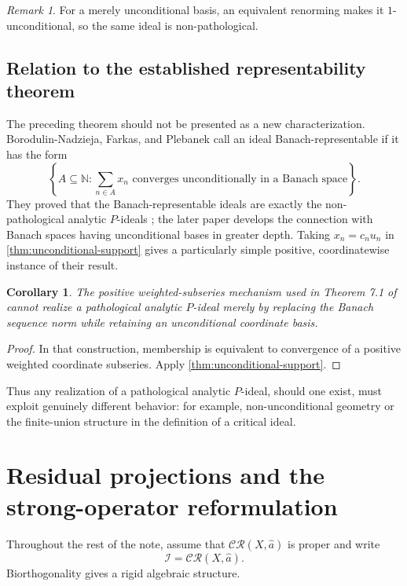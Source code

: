 \documentclass[11pt]{article}
\newtheorem{corollary}[theorem]{Corollary}
\theoremstyle{definition}
\theoremstyle{remark}
\newtheorem{remark}[theorem]{Remark}
\newcommand{\N}{\mathbb N}
\newcommand{\I}{\mathcal I}
\newcommand{\CR}{\mathcal{CR}}
\begin{document}
\begin{remark}
For a merely unconditional basis, an equivalent renorming makes it
$1$-unconditional, so the same ideal is non-pathological.
\end{remark}

\subsection{Relation to the established representability theorem}

The preceding theorem should not be presented as a new characterization.
Borodulin-Nadzieja, Farkas, and Plebanek call an ideal Banach-representable if
it has the form
\[
 \left\{A\subseteq\N:\sum_{n\in A}x_n
        \text{ converges unconditionally in a Banach space}\right\}.
\]
They proved that the Banach-representable ideals are exactly the
non-pathological analytic $P$-ideals \cite{BNFP}; the later paper
\cite{BNF} develops the connection with Banach spaces having unconditional
bases in greater depth.  Taking $x_n=c_nu_n$ in
\cref{thm:unconditional-support} gives a particularly simple positive,
coordinatewise instance of their result.

\begin{corollary}\label{cor:source-mechanism}
The positive weighted-subseries mechanism used in Theorem 7.1 of
\cite{KS} cannot realize a pathological analytic $P$-ideal merely by replacing
the Banach sequence norm while retaining an unconditional coordinate basis.
\end{corollary}

\begin{proof}
In that construction, membership is equivalent to convergence of a positive
weighted coordinate subseries.  Apply \cref{thm:unconditional-support}.
\end{proof}

Thus any realization of a pathological analytic $P$-ideal, should one exist,
must exploit genuinely different behavior: for example, non-unconditional
geometry or the finite-union structure in the definition of a critical ideal.

\section{Residual projections and the strong-operator reformulation}

Throughout the rest of the note, assume that $\CR(X,\widehat a)$ is proper and
write
\[
 \I=\CR(X,\widehat a).
\]
Biorthogonality gives a rigid algebraic structure.
\end{document}
